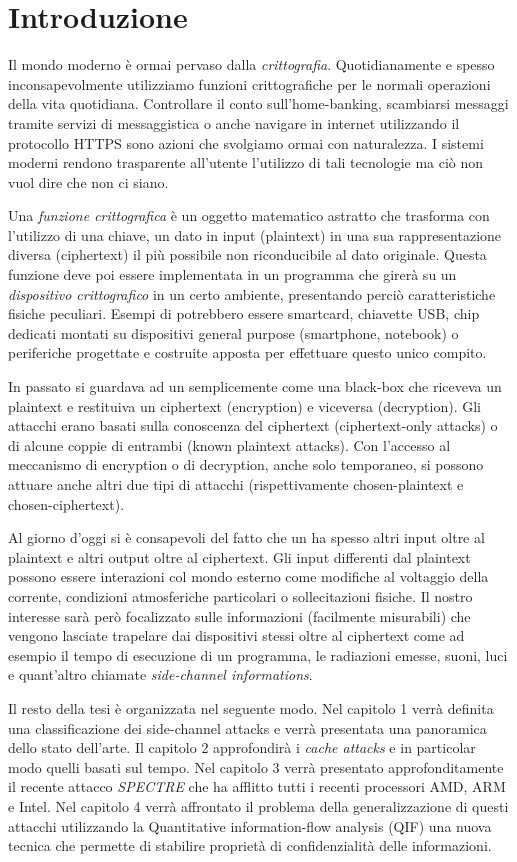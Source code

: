 \chapter{Introduzione}
	Il mondo moderno è ormai pervaso dalla \emph{crittografia}. Quotidianamente e spesso inconsapevolmente utilizziamo funzioni crittografiche per le normali operazioni della vita quotidiana. Controllare il conto sull'home-banking, scambiarsi messaggi tramite servizi di messaggistica o anche navigare in internet utilizzando il protocollo \acs{HTTPS} sono azioni che svolgiamo ormai con naturalezza. I sistemi moderni rendono trasparente all'utente l'utilizzo di tali tecnologie ma ciò non vuol dire che non ci siano.
	
	Una \emph{funzione crittografica} è un oggetto matematico astratto che trasforma con l'utilizzo di una chiave, un dato in input (plaintext) in una sua rappresentazione diversa (ciphertext) il più possibile non riconducibile al dato originale. Questa funzione deve poi essere implementata in un programma che girerà su un \emph{dispositivo crittografico} in un certo ambiente, presentando perciò caratteristiche fisiche peculiari. Esempi di \dispp potrebbero essere smartcard, chiavette \acs{USB}, chip dedicati montati su dispositivi general purpose (smartphone, notebook) o periferiche progettate e costruite apposta per effettuare questo unico compito.
	
	In passato si guardava ad un \disps semplicemente come una black-box che riceveva un plaintext e restituiva un ciphertext (encryption) e viceversa (decryption). Gli attacchi erano basati sulla conoscenza del ciphertext (ciphertext-only attacks) o di alcune coppie di entrambi (known plaintext attacks). Con l'accesso al meccanismo di encryption o di decryption, anche solo temporaneo, si possono attuare anche altri due tipi di attacchi (rispettivamente chosen-plaintext e chosen-ciphertext)\cite{dispenseCS}.
	
	Al giorno d'oggi si è consapevoli del fatto che un \disps ha spesso altri input oltre al plaintext e altri output oltre al ciphertext. Gli input differenti dal plaintext possono essere interazioni col mondo esterno come modifiche al voltaggio della corrente, condizioni atmosferiche particolari o sollecitazioni fisiche. Il nostro interesse sarà però focalizzato sulle informazioni (facilmente misurabili) che vengono lasciate trapelare dai dispositivi stessi oltre al ciphertext come ad esempio il tempo di esecuzione di un programma, le radiazioni emesse, suoni, luci e quant'altro chiamate \emph{side-channel informations}.
	 
	 Il resto della tesi è organizzata nel seguente modo. Nel capitolo 1 verrà definita una classificazione dei side-channel attacks e verrà presentata una panoramica dello stato dell'arte. Il capitolo 2 approfondirà i \emph{cache attacks} e in particolar modo quelli basati sul tempo.
	 Nel capitolo 3 verrà presentato approfonditamente il recente attacco \emph{SPECTRE} che ha afflitto tutti i recenti processori AMD, ARM e Intel.
	 Nel capitolo 4 verrà affrontato il problema della generalizzazione di questi attacchi utilizzando la Quantitative information-flow analysis (QIF) una nuova tecnica che permette di stabilire proprietà di confidenzialità delle informazioni.
